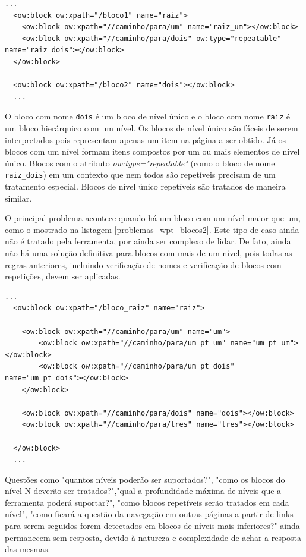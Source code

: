 \begin{lstlisting}[label=problemas_wpt_blocos1]
 ...
  <ow:block ow:xpath="/bloco1" name="raiz">
    <ow:block ow:xpath="//caminho/para/um" name="raiz_um"></ow:block>
    <ow:block ow:xpath="//caminho/para/dois" ow:type="repeatable" name="raiz_dois"></ow:block>
  </ow:block>
 
  <ow:block ow:xpath="/bloco2" name="dois"></ow:block>
  ...
\end{lstlisting}

O bloco com nome \texttt{dois} é um bloco de nível único e o bloco com nome \texttt{raiz} é um bloco hierárquico com um nível. Os blocos de nível único são fáceis de serem interpretados pois representam apenas um item na página a ser obtido. Já os blocos com um nível formam itens compostos por um ou mais elementos de nível único. Blocos com o atributo \emph{ow:type="repeatable"} (como o bloco de nome \texttt{raiz\_dois}) em um contexto que nem todos são repetíveis precisam de um tratamento especial. Blocos de nível único repetíveis são tratados de maneira similar.

O principal problema acontece quando há um bloco com um nível maior que um, como o mostrado na listagem \ref{problemas_wpt_blocos2}. Este tipo de caso ainda não é tratado pela ferramenta, por ainda ser complexo de lidar. De fato, ainda não há uma solução definitiva para blocos com mais de um nível, pois todas as regras anteriores, incluindo verificação de nomes e verificação de blocos com repetições, devem ser aplicadas.

\begin{lstlisting}[label=problemas_wpt_blocos2]
 ...
  <ow:block ow:xpath="/bloco_raiz" name="raiz">

    <ow:block ow:xpath="//caminho/para/um" name="um">
    	<ow:block ow:xpath="//caminho/para/um_pt_um" name="um_pt_um"></ow:block>
    	<ow:block ow:xpath="//caminho/para/um_pt_dois" name="um_pt_dois"></ow:block>
    </ow:block>
    
    <ow:block ow:xpath="//caminho/para/dois" name="dois"></ow:block>
    <ow:block ow:xpath="//caminho/para/tres" name="tres"></ow:block>
    
  </ow:block>
  ...
\end{lstlisting}

Questões como "quantos níveis poderão ser suportados?", "como os blocos do nível N deverão ser tratados?","qual a profundidade máxima de níveis que a ferramenta poderá suportar?", "como blocos repetíveis serão tratados em cada nível", "como ficará a questão da navegação em outras páginas a partir de links para serem seguidos forem detectados em blocos de níveis mais inferiores?" ainda permanecem sem resposta, devido à natureza e complexidade de achar a resposta das mesmas.

